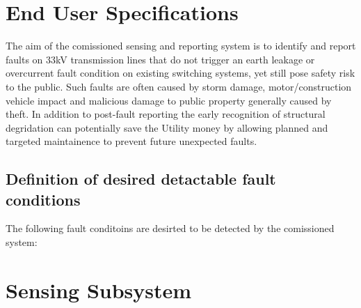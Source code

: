 \documentclass[12pt]{article}
\begin{document}

\tableofcontents
\pagebreak


\section{End User Specifications}

The aim of the comissioned sensing and reporting system is to identify and report faults on 33kV transmission lines 
that do not trigger an earth leakage or overcurrent fault condition on existing switching systems, yet still pose 
safety risk to the public. Such faults are often caused by storm damage, motor/construction vehicle impact and malicious
damage to public property generally caused by theft. In addition to post-fault reporting the early recognition of 
structural degridation can potentially save the Utility money by allowing planned and targeted maintainence to prevent 
future unexpected faults.

\subsection{Definition of desired detactable fault conditions}
The following fault conditoins are desirted to be detected by the comissioned system:



\newpage
\section{Sensing Subsystem} 
\end{document}
